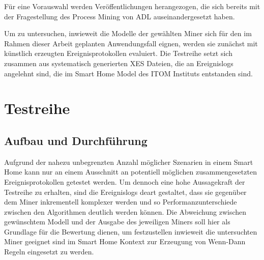 Für eine Vorauswahl werden Veröffentlichungen herangezogen, die sich bereits mit der Fragestellung des Process Mining von ADL auseinandergesetzt haben.

\begin{table}[!h]
\centering
{}
\caption{Vergleich von Process Mining Verfahren hinsichtlich ihrer Eignung für den Einsatz im Smart Home}
\label{tab:my-table}
\end{table}

Um zu untersuchen, inwieweit die Modelle der gewählten Miner sich für den im Rahmen dieser Arbeit geplanten Anwendungsfall eignen, werden sie zunächst mit künstlich erzeugten Ereignisprotokollen evaluiert. Die Testreihe setzt sich zusammen aus systematisch generierten XES Dateien, die an Ereignislogs angelehnt sind, die im Smart Home Model des ITOM Instituts entstanden sind.


\clearpage
\section{Testreihe}
\subsection{Aufbau und Durchführung}
Aufgrund der nahezu unbegrenzten Anzahl möglicher Szenarien in einem Smart Home kann nur an einem Ausschnitt an potentiell möglichen zusammengesetzten Ereignisprotokollen getestet werden. Um dennoch eine hohe Aussagekraft der Testreihe zu erhalten, sind die Ereignislogs deart gestaltet, dass sie gegenüber dem Miner inkrementell komplexer werden und so Performanzunterschiede zwischen den Algorithmen deutlich werden können. Die Abweichung zwischen gewünschtem Modell und der Ausgabe des jeweiligen Miners soll hier als Grundlage für die Bewertung dienen, um festzustellen inwieweit die untersuchten Miner geeignet sind im Smart Home Kontext zur Erzeugung von Wenn-Dann Regeln eingesetzt zu werden. 

